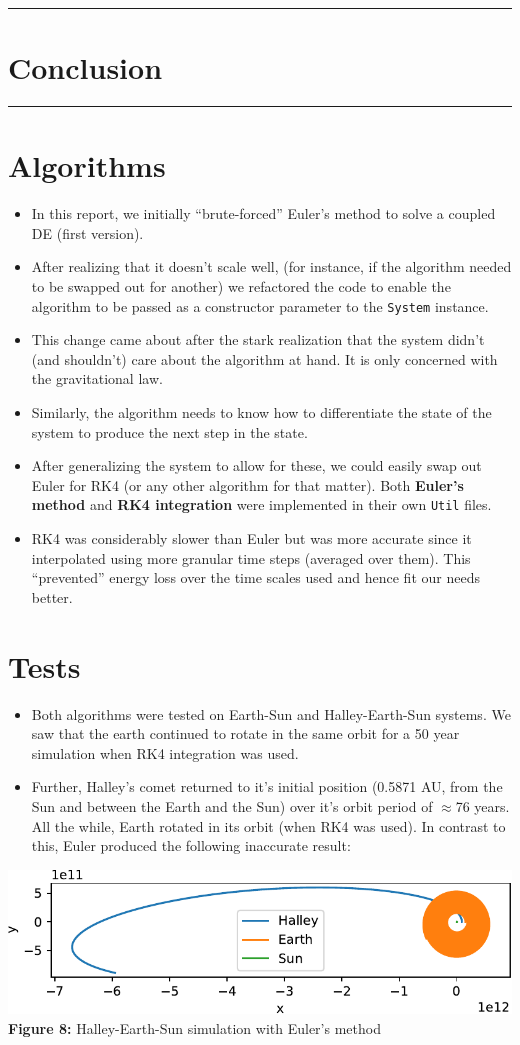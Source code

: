 \documentclass[11pt]{article}
\newcommand{\psection}[1]{{
    \begin{center}
        \noindent \rule{17cm}{0.4pt}
        \section*{\LARGE #1}
        \noindent \rule{17cm}{0.4pt}
    \end{center}
}}
\newcommand{\psubsection}[1]{{\section*{\LARGE #1}}}
\begin{document}
    \newpage
    
    \psection{Conclusion}
    \psubsection{Algorithms}
    \begin{itemize}
        \item In this report, we initially ``brute-forced'' Euler's method to solve a coupled DE (first version).
        \item After realizing that it doesn't scale well, (for instance, if the algorithm needed to be swapped out for another) we refactored the code to enable the algorithm to be passed as a constructor parameter to the \texttt{System} instance.
        \item This change came about after the stark realization that the system didn't (and shouldn't) care about the algorithm at hand. It is only concerned with the gravitational law.
        \item Similarly, the algorithm needs to know how to differentiate the state of the system to produce the next step in the state.
        \item After generalizing the system to allow for these, we could easily swap out Euler for RK4 (or any other algorithm for that matter). Both \textbf{Euler's method} and \textbf{RK4 integration} were implemented in their own \texttt{Util} files.
        \item RK4 was considerably slower than Euler but was more accurate since it interpolated using more granular time steps (averaged over them). This ``prevented'' energy loss over the time scales used and hence fit our needs better.
    \end{itemize}
    \psubsection{Tests}
    \begin{itemize}
        \item Both algorithms were tested on Earth-Sun and Halley-Earth-Sun systems. We saw that the earth continued to rotate in the same orbit for a 50 year simulation when RK4 integration was used.
        \item Further, Halley's comet returned to it's initial position (0.5871 AU, from the Sun and between the Earth and the Sun) over it's orbit period of $\approx$76 years. All the while, Earth rotated in its orbit (when RK4 was used). In contrast to this, Euler produced the following inaccurate result:
    \end{itemize}
    \begin{center}
        \includegraphics[scale = 1.2]{images/inaccurate-crop}
        \\ \caption{\textbf{Figure 8:} Halley-Earth-Sun simulation with Euler's method}
        \label{fig:fig8}
    \end{center}
\end{document}
